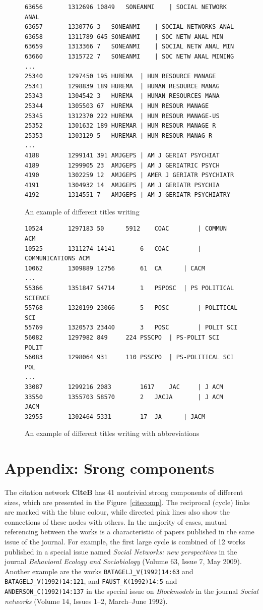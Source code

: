 \documentclass[11pt]{article} %
\begin{document}
\begin{figure}
\renewcommand{\baselinestretch}{0.8}
\scriptsize
\begin{verbatim}
63656		1312696	10849	SONEANMI	| SOCIAL NETWORK ANAL
63657		1330776	3	SONEANMI	| SOCIAL NETWORKS ANAL
63658		1311789	645	SONEANMI	| SOC NETW ANAL MIN
63659		1313366	7	SONEANMI	| SOCIAL NETW ANAL MIN
63660		1315722	7	SONEANMI	| SOC NETW ANAL MINING
...
25340		1297450	195	HUREMA	| HUM RESOURCE MANAGE
25341		1298839	189	HUREMA	| HUMAN RESOURCE MANAG
25343		1304542	3	HUREMA	| HUMAN RESOURCES MANA
25344		1305503	67	HUREMA	| HUM RESOUR MANAGE
25345		1312370	222	HUREMA	| HUM RESOUR MANAGE-US
25352		1301632	189	HUREMAR	| HUM RESOUR MANAGE R
25353		1303129	5	HUREMAR	| HUM RESOUR MANAG R
...
4188		1299141	391	AMJGEPS	| AM J GERIAT PSYCHIAT
4189		1299905	23	AMJGEPS	| AM J GERIATRIC PSYCH
4190		1302259	12	AMJGEPS	| AMER J GERIATR PSYCHIATR
4191		1304932	14	AMJGEPS	| AM J GERIATR PSYCHIA
4192		1314551	7	AMJGEPS	| AM J GERIATR PSYCHIATRY
\end{verbatim}
\caption{An example of different titles writing}\label{jour1}
\end{figure}

\begin{figure}
\renewcommand{\baselinestretch}{0.8}
\scriptsize
\begin{verbatim}
10524		1297183	50		5912	COAC		| COMMUN ACM
10525		1311274	14141		6	COAC		| COMMUNICATIONS ACM
10062		1309889	12756		61	CA		| CACM
...
55366		1351847	54714		1	PSPOSC 	| PS POLITICAL SCIENCE
55768		1320199	23066		5	POSC		| POLITICAL SCI
55769		1320573	23440		3	POSC		| POLIT SCI
56082		1297982	849		224	PSSCPO	| PS-POLIT SCI POLIT
56083		1298064	931		110	PSSCPO	| PS-POLITICAL SCI POL
...
33087		1299216	2083		1617	JAC		| J ACM
33550		1355703	58570		2	JACJA		| J ACM JACM
32955		1302464	5331		17	JA		| JACM
\end{verbatim}
\caption{An example of different titles writing with abbreviations}\label{jour2}
\end{figure}

\appendix
\section{Appendix: Srong components}

The citation network \textbf{CiteB} has 41 nontrivial strong components of different sizes, which are presented in the  Figure~\ref{citecomp}. The reciprocal (cycle) links are marked with the bluse colour, while directed pink lines also show the connections of these nodes with others. In the majority of cases, mutual referencing between the works is a characteristic of papers published in the same issue of the journal. For example, the first large cycle is combined of 12 works published in a special issue named \textit{Social Networks: new perspectives} in the journal \textit{Behavioral Ecology and Sociobiology} (Volume 63, Issue 7, May 2009). Another example are the works \texttt {BATAGELJ\_V(1992)14:63} and \texttt {BATAGELJ\_V(1992)14:121}, and \texttt {FAUST\_K(1992)14:5} and \texttt {ANDERSON\_C(1992)14:137} in the special issue on \textit{Blockmodels} in the journal \textit{Social networks} (Volume 14, Issues 1–2, March–June 1992). \medskip
\end{document}
